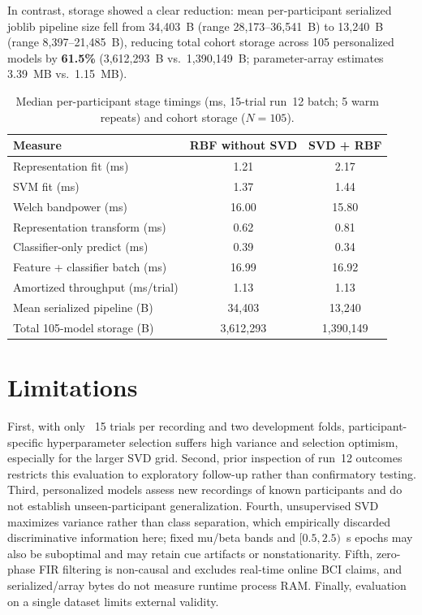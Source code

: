 \documentclass[conference]{IEEEtran}
\begin{document}
In contrast, storage showed a clear reduction: mean per-participant serialized
joblib pipeline size fell from 34,403~B (range 28,173--36,541~B) to 13,240~B
(range 8,397--21,485~B), reducing total cohort storage across 105 personalized
models by \textbf{61.5\%} (3,612,293~B vs.\ 1,390,149~B; parameter-array
estimates 3.39~MB vs.\ 1.15~MB).

\begin{table}[ht]
\centering
\caption{Median per-participant stage timings (ms, 15-trial run~12 batch; 5 warm repeats) and cohort storage ($N=105$).}
\label{tab:resources}
\begin{tabular}{lcc}\hline
Measure & RBF without SVD & SVD + RBF \\ \hline
Representation fit (ms) & 1.21 & 2.17 \\
SVM fit (ms) & 1.37 & 1.44 \\
Welch bandpower (ms) & 16.00 & 15.80 \\
Representation transform (ms) & 0.62 & 0.81 \\
Classifier-only predict (ms) & 0.39 & 0.34 \\
Feature + classifier batch (ms) & 16.99 & 16.92 \\
Amortized throughput (ms/trial) & 1.13 & 1.13 \\
Mean serialized pipeline (B) & 34,403 & 13,240 \\
Total 105-model storage (B) & 3,612,293 & 1,390,149 \\
\hline\end{tabular}
\end{table}

\section{Limitations}
First, with only ~15 trials per recording and two development folds,
participant-specific hyperparameter selection suffers high variance and
selection optimism, especially for the larger SVD grid. Second, prior inspection
of run~12 outcomes restricts this evaluation to exploratory follow-up rather
than confirmatory testing. Third, personalized models assess new recordings of
known participants and do not establish unseen-participant generalization.
Fourth, unsupervised SVD maximizes variance rather than class separation, which
empirically discarded discriminative information here; fixed mu/beta bands and
$[0.5,2.5)$~s epochs may also be suboptimal and may retain cue artifacts or
nonstationarity. Fifth, zero-phase FIR filtering is non-causal and excludes
real-time online BCI claims, and serialized/array bytes do not measure runtime
process RAM. Finally, evaluation on a single dataset limits external validity.
\end{document}

